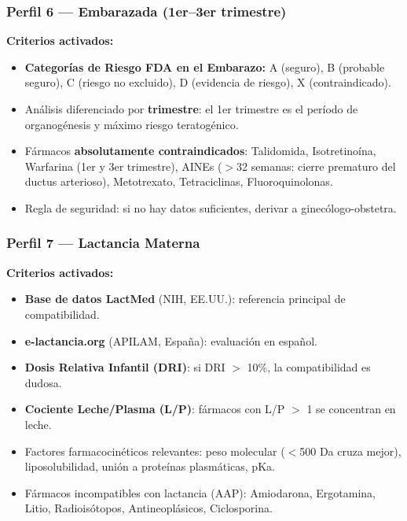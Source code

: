 \documentclass[12pt,a4paper]{article}
\begin{document}
\subsubsection{Perfil 6 --- Embarazada (1er--3er trimestre)}

\begin{tcolorbox}[colback=embarazo!5, colframe=embarazo, title=\textbf{Embarazada --- Gestación}]
  \textbf{Criterios activados:}
  \begin{itemize}
    \item \textbf{Categorías de Riesgo FDA en el Embarazo:} A (seguro), B (probable seguro), C
      (riesgo no excluido), D (evidencia de riesgo), X (contraindicado).
    \item Análisis diferenciado por \textbf{trimestre}: el 1er trimestre es el período de
      organogénesis y máximo riesgo teratogénico.
    \item Fármacos \textbf{absolutamente contraindicados}: Talidomida, Isotretinoína, Warfarina
      (1er y 3er trimestre), AINEs ($>$32 semanas: cierre prematuro del ductus arterioso),
      Metotrexato, Tetraciclinas, Fluoroquinolonas.
    \item Regla de seguridad: si no hay datos suficientes, derivar a ginecólogo-obstetra.
  \end{itemize}
\end{tcolorbox}

\subsubsection{Perfil 7 --- Lactancia Materna}

\begin{tcolorbox}[colback=lactancia!5, colframe=lactancia, title=\textbf{Lactancia Materna}]
  \textbf{Criterios activados:}
  \begin{itemize}
    \item \textbf{Base de datos LactMed} (NIH, EE.UU.): referencia principal de compatibilidad.
    \item \textbf{e-lactancia.org} (APILAM, España): evaluación en español.
    \item \textbf{Dosis Relativa Infantil (DRI)}: si DRI $>$ 10\%, la compatibilidad es dudosa.
    \item \textbf{Cociente Leche/Plasma (L/P)}: fármacos con L/P $>$ 1 se concentran en leche.
    \item Factores farmacocinéticos relevantes: peso molecular ($<$500 Da cruza mejor),
      liposolubilidad, unión a proteínas plasmáticas, pKa.
    \item Fármacos incompatibles con lactancia (AAP): Amiodarona, Ergotamina, Litio,
      Radioisótopos, Antineoplásicos, Ciclosporina.
  \end{itemize}
\end{tcolorbox}
\end{document}
